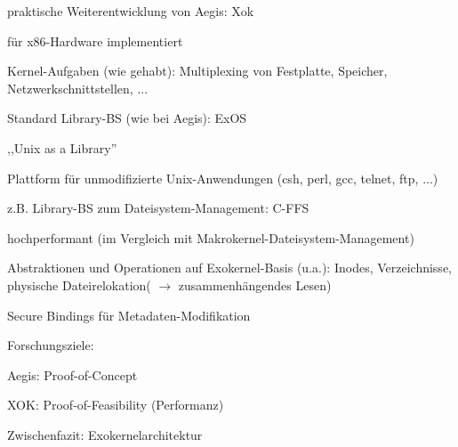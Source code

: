 \documentclass[a4paper]{article}
\begin{document}
\begin{multicols}{3}
    \begin{itemize*}
        \item praktische Weiterentwicklung von Aegis: Xok
        \item für x86-Hardware implementiert
        \item Kernel-Aufgaben (wie gehabt): Multiplexing von Festplatte, Speicher,
        Netzwerkschnittstellen, ...
        \item Standard Library-BS (wie bei Aegis): ExOS
        \begin{itemize*}
            \item ,,Unix as a Library''
            \item Plattform für unmodifizierte Unix-Anwendungen (csh, perl, gcc, telnet, ftp, ...)
        \end{itemize*}
        \item z.B. Library-BS zum Dateisystem-Management: C-FFS
        \begin{itemize*}
            \item hochperformant (im Vergleich mit Makrokernel-Dateisystem-Management)
            \item Abstraktionen und Operationen auf Exokernel-Basis (u.a.): Inodes, Verzeichnisse, physische Dateirelokation( $\rightarrow$ zusammenhängendes Lesen)
            \item Secure Bindings für Metadaten-Modifikation
        \end{itemize*}
        \item Forschungsziele:
        \begin{itemize*}
            \item Aegis: Proof-of-Concept
            \item XOK: Proof-of-Feasibility (Performanz)
        \end{itemize*}
    \end{itemize*}

    Zwischenfazit: Exokernelarchitektur


\end{multicols}
\end{document}
